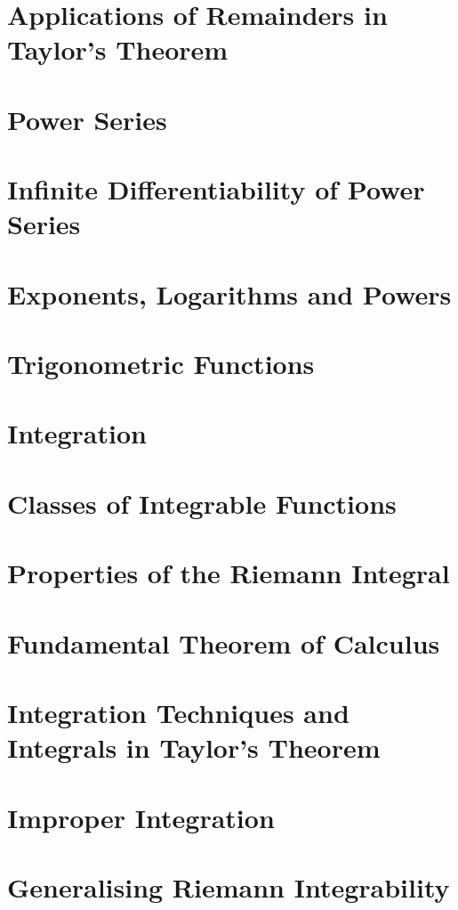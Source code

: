\documentclass{article}
\begin{document}
\section{Applications of Remainders in Taylor's Theorem}

\section{Power Series}

\section{Infinite Differentiability of Power Series}

\section{Exponents, Logarithms and Powers}

\section{Trigonometric Functions}

\section{Integration}

\section{Classes of Integrable Functions}

\section{Properties of the Riemann Integral}

\section{Fundamental Theorem of Calculus}

\section{Integration Techniques and Integrals in Taylor's Theorem}

\section{Improper Integration}

\section{Generalising Riemann Integrability}

\end{document}
